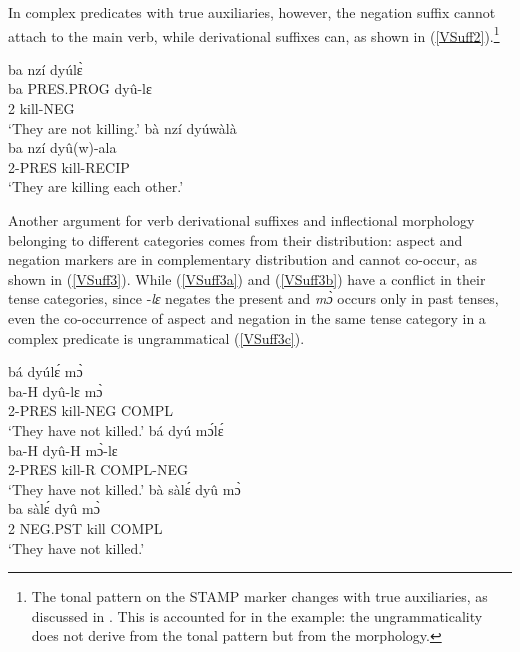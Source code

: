 \noindent In complex predicates with true auxiliaries, however, the negation suffix cannot attach to the main verb, while derivational suffixes can, as shown in (\ref{VSuff2}).\footnote{The tonal pattern on the STAMP marker changes with true auxiliaries, as discussed in . This is accounted for in the example: the ungrammaticality does not derive from the tonal pattern but from the morphology.}

\begin{exe}
\ex\label{VSuff2}
\begin{xlist}
\ex \label{VSuff2a}
  \glll  *ba nzí dyúlɛ̀ \\
          ba PRES.PROG dyû-lɛ \\
            2 kill-NEG \\
    \trans `They are not killing.'
\ex\label{VSuff2b}
 \glll  bà nzí dyúwàlà \\
         ba nzí dyû(w)-ala \\
	2-PRES kill-RECIP \\
    \trans `They are killing each other.'
\end{xlist}
\end{exe}


Another argument for verb derivational suffixes and inflectional morphology belonging to different categories comes from their distribution: aspect and negation markers are in complementary distribution and cannot co-occur, as shown in (\ref{VSuff3}). While (\ref{VSuff3a}) and (\ref{VSuff3b}) have a conflict in their tense categories, since -{\itshape lɛ} negates the present and {\itshape mɔ̀} occurs only in past tenses, even the co-occurrence of aspect and negation in the same tense category in a complex predicate is ungrammatical (\ref{VSuff3c}).

\begin{exe}
\ex\label{VSuff3}
\begin{xlist}
\ex \label{VSuff3a}
  \glll  *bá dyúlɛ́ mɔ̀  \\
          ba-H dyû-lɛ mɔ̀ \\
            2-PRES kill-NEG COMPL \\
    \trans `They have not killed.'
\ex\label{VSuff3b}
 \glll *bá dyú mɔ́lɛ́ \\
         ba-H dyû-H mɔ̀-lɛ \\
	2-PRES kill-R COMPL-NEG \\
    \trans `They have not killed.'
\ex\label{VSuff3c}
 \glll *bà sàlɛ́ dyû mɔ̀ \\
         ba sàlɛ́ dyû mɔ̀ \\
	2 NEG.PST kill COMPL \\
    \trans `They have not killed.'
\end{xlist}
\end{exe}

